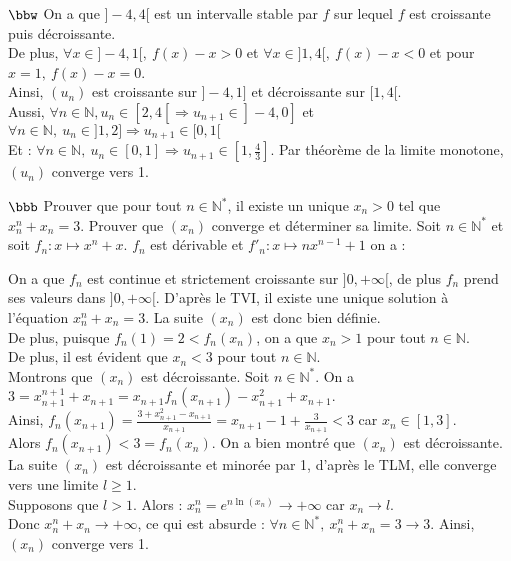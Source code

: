 \documentclass[11pt]{article}
\begin{document}
\begin{exercice}{$\bbw$}{}
    On a que $]-4,4[$ est un intervalle stable par $f$ sur lequel $f$ est croissante puis décroissante.\\
    De plus, $\forall x\in]-4,1[, ~ f(x)-x > 0$ et $\forall x \in ]1,4[, ~ f(x)-x < 0$ et pour $x=1, ~ f(x)-x=0$.\\
    Ainsi, $(u_n)$ est croissante sur $]-4,1]$ et décroissante sur $[1,4[$.\\
    Aussi, $\forall n\in\mathbb{N}, u_n \in[2,4[ \Rightarrow u_{n+1} \in ]-4,0]$ et $\forall n \in\mathbb{N}, ~ u_n\in ]1,2] \Rightarrow u_{n+1} \in [0,1[$\\
    Et : $\forall n \in\mathbb{N}, ~ u_n \in [0,1] \Rightarrow u_{n+1} \in [1,\frac{4}{3}]$. Par théorème de la limite monotone, $(u_n)$ converge vers 1.
\end{exercice}

\begin{exercice}{$\bbb$}{}
    Prouver que pour tout $n\in\mathbb{N}^*$, il existe un unique $x_n>0$ tel que $x^n_n + x_n = 3$. Prouver que $(x_n)$ converge et déterminer sa limite.
    \tcblower
    Soit $n\in\mathbb{N}^*$ et soit $f_n : x\mapsto x^n + x$. $f_n$ est dérivable et $f'_n: x \mapsto nx^{n-1} + 1$ on a :
    \begin{center}
    \end{center}
    On a que $f_n$ est continue et strictement croissante sur $]0, +\infty[$, de plus $f_n$ prend ses valeurs dans $]0, +\infty[$. D'après le TVI, il existe une unique solution à l'équation $x_n^n +x_n = 3$. La suite $(x_n)$ est donc bien définie.\\
    De plus, puisque $f_n(1)=2<f_n(x_n)$, on a que $x_n>1$ pour tout $n\in\mathbb{N}$.\\
    De plus, il est évident que $x_n<3$ pour tout $n\in\mathbb{N}$.\\
    Montrons que $(x_n)$ est décroissante. Soit $n\in\mathbb{N}^*$. On a $3 = x^{n+1}_{n+1}+x_{n+1} = x_{n+1}f_n(x_{n+1}) - x_{n+1}^2 + x_{n+1}$.\\
    Ainsi, $f_n(x_{n+1})=\frac{3 +x_{n+1}^2  - x_{n+1}}{x_{n+1}}=x_{n+1} - 1 + \frac{3}{x_{n+1}}<3$ car $x_n\in[1,3]$.\\
    Alors $f_n(x_{n+1})<3=f_n(x_n)$. On a bien montré que $(x_n)$ est décroissante.\\
    La suite $(x_n)$ est décroissante et minorée par 1, d'après le TLM, elle converge vers une limite $l\geq1$.\\
    Supposons que $l>1$. Alors : $x_n^n = e^{n\ln(x_n)} \to +\infty$ car $x_n \to l$.\\
    Donc $x_n^n + x_n \to +\infty$, ce qui est absurde : $\forall n \in \mathbb{N}^*, ~ x_n^n + x_n = 3 \to 3$.
    Ainsi, $(x_n)$ converge vers 1.
\end{exercice}
\end{document}
